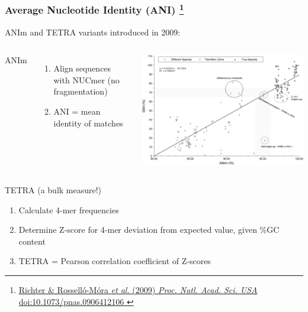 %
\begin{frame}
  \frametitle{Average Nucleotide Identity (ANI)
  \footnote{\tiny{\href{http://dx.doi.org/10.1073/pnas.0906412106
}{Richter \& Rossell\'{o}-M\'{o}ra \textit{et al.} (2009) \textit{Proc. Natl. Acad. Sci. USA} doi:10.1073/pnas.0906412106
}}}
  }
  ANIm and TETRA variants introduced in 2009:
  \begin{columns}[T] 
      \textcolor{RawSienna}{ANIm}
      \begin{enumerate}
        \item \textcolor{hutton_green}{Align sequences with NUCmer (no fragmentation)}
        \item \textcolor{hutton_purple}{ANI = mean identity of matches}
      \end{enumerate}
      \includegraphics[width=\textwidth]{images/anim_ddh_equiv}
  \end{columns}    
  \textcolor{RawSienna}{TETRA} (a bulk measure!)
  \begin{enumerate}
    \item \textcolor{hutton_green}{Calculate 4-mer frequencies}
    \item \textcolor{hutton_blue}{Determine Z-score for 4-mer deviation from expected value, given \%GC content}
    \item \textcolor{hutton_purple}{TETRA = Pearson correlation coefficient of Z-scores}
  \end{enumerate}
\end{frame}


